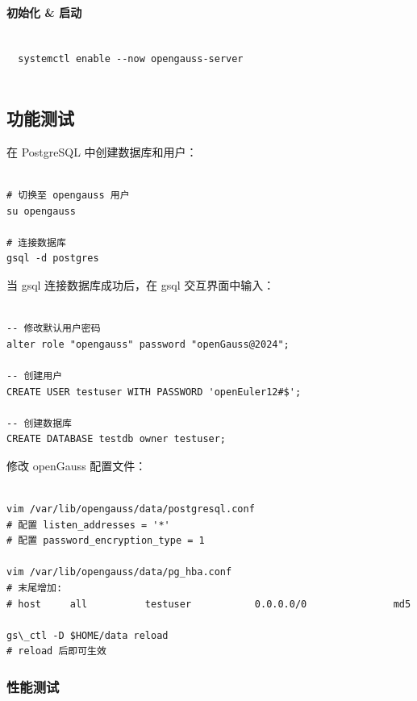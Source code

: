 \documentclass{article}
\begin{document}
\paragraph{初始化 \& 启动}

\begin{verbatim}
  
  systemctl enable --now opengauss-server
  
\end{verbatim}

\subsection{功能测试}

在 PostgreSQL 中创建数据库和用户：

\begin{verbatim}
  
# 切换至 opengauss 用户
su opengauss

# 连接数据库
gsql -d postgres

\end{verbatim}

当 gsql 连接数据库成功后，在 gsql 交互界面中输入：

\begin{verbatim}
  
-- 修改默认用户密码
alter role "opengauss" password "openGauss@2024";

-- 创建用户
CREATE USER testuser WITH PASSWORD 'openEuler12#$';

-- 创建数据库
CREATE DATABASE testdb owner testuser;

\end{verbatim}


修改 openGauss 配置文件：

\begin{verbatim}
  
vim /var/lib/opengauss/data/postgresql.conf
# 配置 listen_addresses = '*'
# 配置 password_encryption_type = 1

vim /var/lib/opengauss/data/pg_hba.conf
# 末尾增加: 
# host     all          testuser           0.0.0.0/0               md5

gs\_ctl -D $HOME/data reload
# reload 后即可生效

\end{verbatim}

\subsubsection{性能测试}
\end{document}
